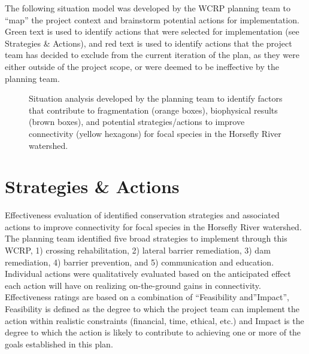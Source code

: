 \documentclass[
  letterpaper,
  DIV=11,
  numbers=noendperiod]{scrreprt}
\begin{document}

The following situation model was developed by the WCRP planning team to
``map'' the project context and brainstorm potential actions for
implementation. Green text is used to identify actions that were
selected for implementation (see Strategies \& Actions), and red text is
used to identify actions that the project team has decided to exclude
from the current iteration of the plan, as they were either outside of
the project scope, or were deemed to be ineffective by the planning
team.

\begin{figure}


\caption{\label{fig-sitan}Situation analysis developed by the planning
team to identify factors that contribute to fragmentation (orange
boxes), biophysical results (brown boxes), and potential
strategies/actions to improve connectivity (yellow hexagons) for focal
species in the Horsefly River watershed.}

\end{figure}%

\section*{Strategies \& Actions}\label{strategies-actions}


Effectiveness evaluation of identified conservation strategies and
associated actions to improve connectivity for focal species in the
Horsefly River watershed. The planning team identified five broad
strategies to implement through this WCRP, 1) crossing rehabilitation,
2) lateral barrier remediation, 3) dam remediation, 4) barrier
prevention, and 5) communication and education. Individual actions were
qualitatively evaluated based on the anticipated effect each action will
have on realizing on-the-ground gains in connectivity. Effectiveness
ratings are based on a combination of ``Feasibility and''Impact'',
Feasibility is defined as the degree to which the project team can
implement the action within realistic constraints (financial, time,
ethical, etc.) and Impact is the degree to which the action is likely to
contribute to achieving one or more of the goals established in this
plan.
\end{document}
